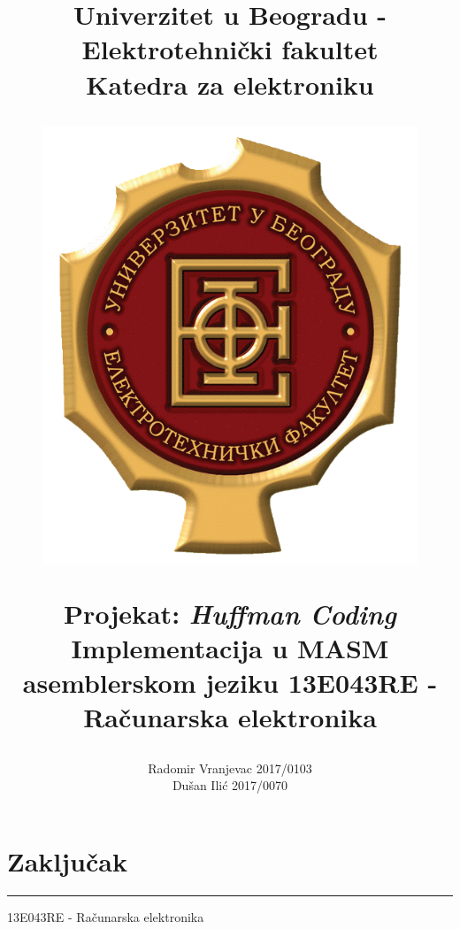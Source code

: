 \documentclass[a4paper, 12pt]{article}
\title{
\Large{Univerzitet u Beogradu - Elektrotehnički fakultet}\\
\vspace{0.5cm}
\large{Katedra za elektroniku}\\
\vspace{1.2cm}
\begin{figure}[h!]
\centering
\includegraphics[scale=1.2]{logo}
\end{figure}
\vspace{3cm}
\Huge{\textbf{Projekat: \textit{Huffman Coding}}} \\
\LARGE{\textbf{Implementacija u \textbf{MASM} asemblerskom jeziku}}
\vspace{1cm}
\Large{13E043RE - Računarska elektronika}\\
\vspace{2cm}
}
\author{Radomir Vranjevac 2017/0103\\Dušan Ilić 2017/0070}
\date{}
\newcommand{\btmline}{
\vfill
\rule{0.9\textwidth}{0.4mm}
\begin{center}
13E043RE - Računarska elektronika
\end{center}}
\begin{document}
\maketitle
\newpage

\section*{Zaključak}


\btmline\newpage
\end{document}
